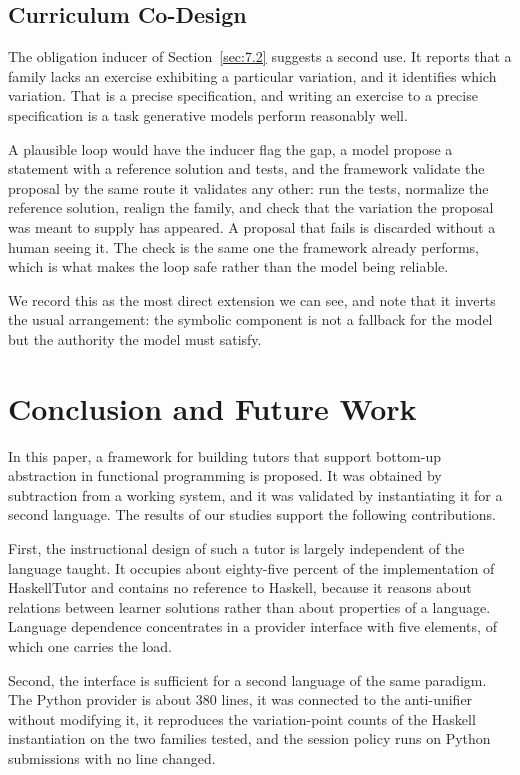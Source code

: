 \documentclass[journal]{IEEEtran}
\begin{document}
\subsection{Curriculum Co-Design}\label{sec:10.5}
The obligation inducer of Section~\ref{sec:7.2} suggests a second use. It reports that a family lacks an exercise exhibiting a particular variation, and it identifies which variation. That is a precise specification, and writing an exercise to a precise specification is a task generative models perform reasonably well.

A plausible loop would have the inducer flag the gap, a model propose a statement with a reference solution and tests, and the framework validate the proposal by the same route it validates any other: run the tests, normalize the reference solution, realign the family, and check that the variation the proposal was meant to supply has appeared. A proposal that fails is discarded without a human seeing it. The check is the same one the framework already performs, which is what makes the loop safe rather than the model being reliable.

We record this as the most direct extension we can see, and note that it inverts the usual arrangement: the symbolic component is not a fallback for the model but the authority the model must satisfy.

\section{Conclusion and Future Work}\label{sec:11}
In this paper, a framework for building tutors that support bottom-up
abstraction in functional programming is proposed. It was obtained by
subtraction from a working system, and it was validated by instantiating
it for a second language. The results of our studies support the
following contributions.

First, the instructional design of such a tutor is largely independent
of the language taught. It occupies about eighty-five percent of the
implementation of HaskellTutor and contains no reference to Haskell,
because it reasons about relations between learner solutions rather than
about properties of a language. Language dependence concentrates in a
provider interface with five elements, of which one carries the load.

Second, the interface is sufficient for a second language of the same
paradigm. The Python provider is about 380 lines, it was connected to the
anti-unifier without modifying it, it reproduces the variation-point
counts of the Haskell instantiation on the two families tested, and the
session policy runs on Python submissions with no line changed.
\end{document}
